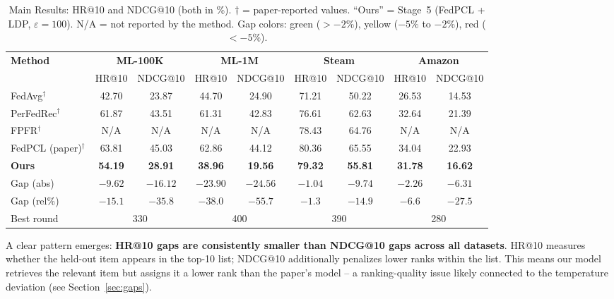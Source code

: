 \documentclass[10pt,twocolumn]{article}
\begin{document}
\begin{table}[ht]
\centering
\caption{Main Results: HR@10 and NDCG@10 (both in \%). $\dagger$ =
paper-reported values. ``Ours'' = Stage~5 (FedPCL + LDP,
$\varepsilon{=}100$). N/A = not reported by the method.
Gap colors: {\color{goodgreen}green} ($>-2\%$),
{\color{warnyellow}yellow} ($-5\%$ to $-2\%$),
{\color{warnred}red} ($<-5\%$).}
\label{tab:main_results}
\setlength{\tabcolsep}{5pt}
\begin{tabular}{lcccccccc}
\toprule
\multirow{2}{*}{\textbf{Method}}
  & \multicolumn{2}{c}{\textbf{ML-100K}}
  & \multicolumn{2}{c}{\textbf{ML-1M}}
  & \multicolumn{2}{c}{\textbf{Steam}}
  & \multicolumn{2}{c}{\textbf{Amazon}} \\
\cmidrule(lr){2-3}\cmidrule(lr){4-5}\cmidrule(lr){6-7}\cmidrule(lr){8-9}
  & HR@10 & NDCG@10
  & HR@10 & NDCG@10
  & HR@10 & NDCG@10
  & HR@10 & NDCG@10 \\
\midrule
FedAvg$^{\dagger}$
  & 42.70 & 23.87 & 44.70 & 24.90
  & 71.21 & 50.22 & 26.53 & 14.53 \\
PerFedRec$^{\dagger}$
  & 61.87 & 43.51 & 61.31 & 42.83
  & 76.61 & 62.63 & 32.64 & 21.39 \\
FPFR$^{\dagger}$
  & N/A & N/A & N/A & N/A
  & 78.43 & 64.76 & N/A & N/A \\
FedPCL (paper)$^{\dagger}$
  & 63.81 & 45.03 & 62.86 & 44.12
  & 80.36 & 65.55 & 34.04 & 22.93 \\
\midrule
\textbf{Ours}
  & \textbf{54.19} & \textbf{28.91}
  & \textbf{38.96} & \textbf{19.56}
  & \textbf{79.32} & \textbf{55.81}
  & \textbf{31.78} & \textbf{16.62} \\
\midrule
Gap (abs)
  & {\color{warnred}$-9.62$}
  & {\color{warnred}$-16.12$}
  & {\color{warnred}$-23.90$}
  & {\color{warnred}$-24.56$}
  & {\color{goodgreen}$-1.04$}
  & {\color{warnred}$-9.74$}
  & {\color{warnyellow}$-2.26$}
  & {\color{warnred}$-6.31$} \\
Gap (rel\%)
  & $-15.1$ & $-35.8$
  & $-38.0$ & $-55.7$
  & $-1.3$  & $-14.9$
  & $-6.6$  & $-27.5$ \\
Best round
  & \multicolumn{2}{c}{330}
  & \multicolumn{2}{c}{400}
  & \multicolumn{2}{c}{390}
  & \multicolumn{2}{c}{280} \\
\bottomrule
\end{tabular}
\end{table}

A clear pattern emerges: \textbf{HR@10 gaps are consistently smaller
than NDCG@10 gaps across all datasets}. HR@10 measures whether the
held-out item appears in the top-10 list; NDCG@10 additionally penalizes
lower ranks within the list. This means our model retrieves the relevant
item but assigns it a lower rank than the paper's model -- a
ranking-quality issue likely connected to the temperature deviation (see
Section~\ref{sec:gaps}).
\end{document}
